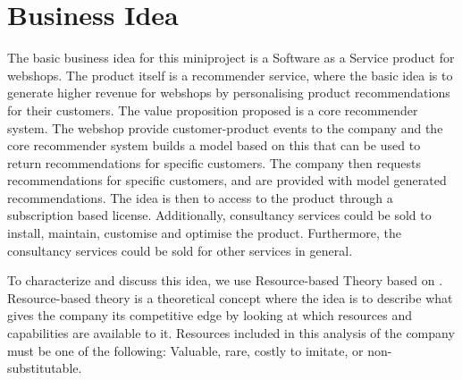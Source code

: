 \section{Business Idea}
The basic business idea for this miniproject is a Software as a Service product for webshops. 
The product itself is a recommender service, where the basic idea is to generate higher revenue for webshops by personalising product recommendations for their customers. 
The value proposition proposed is a core recommender system.
The webshop provide customer-product events to the company and the core recommender system builds a model based on this that can be used to return recommendations for specific customers.
The company then requests recommendations for specific customers, and are provided with model generated recommendations. 
The idea is then to access to the product through a subscription based license.
Additionally, consultancy services could be sold to install, maintain, customise and optimise the product. Furthermore, the consultancy services could be sold for other services in general.

To characterize and discuss this idea, we use Resource-based Theory based on \citet[pg. 13]{book:jrose}.
Resource-based theory is a theoretical concept where the idea is to describe what gives the company its competitive edge by looking at which resources and capabilities are available to it.
Resources included in this analysis of the company must be one of the following: Valuable, rare, costly to imitate, or non-substitutable.


